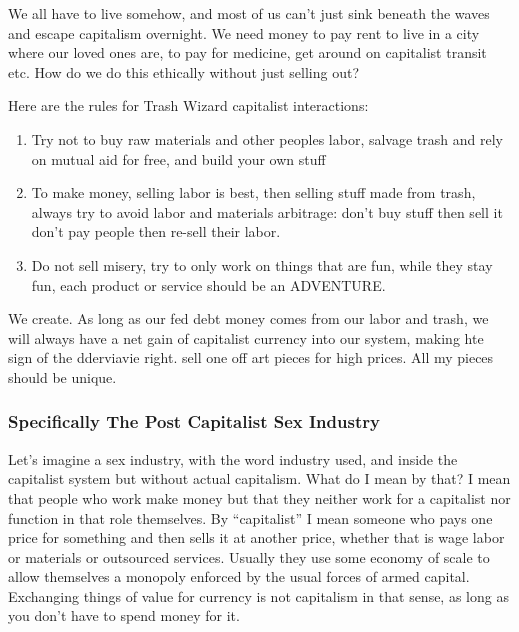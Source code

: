 We all have to live somehow, and most of us can't just sink beneath the
waves and escape capitalism overnight. We need money to pay rent to live
in a city where our loved ones are, to pay for medicine, get around on
capitalist transit etc. How do we do this ethically without just selling
out?

Here are the rules for Trash Wizard capitalist interactions:

\begin{enumerate}
\def\labelenumi{\arabic{enumi}.}
\tightlist
\item
  Try not to buy raw materials and other peoples labor, salvage trash
  and rely on mutual aid for free, and build your own stuff
\item
  To make money, selling labor is best, then selling stuff made from
  trash, always try to avoid labor and materials arbitrage: don't buy
  stuff then sell it don't pay people then re-sell their labor.\\
\item
  Do not sell misery, try to only work on things that are fun, while
  they stay fun, each product or service should be an ADVENTURE.
\end{enumerate}

We create. As long as our fed debt money comes from our labor and trash,
we will always have a net gain of capitalist currency into our system,
making hte sign of the dderviavie right. sell one off art pieces for
high prices. All my pieces should be unique.

\subsubsection{Specifically The Post Capitalist Sex
Industry}\label{specifically-the-post-capitalist-sex-industry}

Let's imagine a sex industry, with the word industry used, and inside
the capitalist system but without actual capitalism. What do I mean by
that? I mean that people who work make money but that they neither work
for a capitalist nor function in that role themselves. By ``capitalist''
I mean someone who pays one price for something and then sells it at
another price, whether that is wage labor or materials or outsourced
services. Usually they use some economy of scale to allow themselves a
monopoly enforced by the usual forces of armed capital. Exchanging
things of value for currency is not capitalism in that sense, as long as
you don't have to spend money for it.


